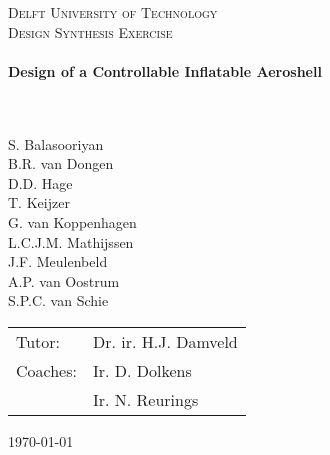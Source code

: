 \begin{titlepage}
\begin{center}
\AddToShipoutPicture*{\BackgroundPic}
\color{white}
\textsc{\LARGE Delft University of Technology}\\[0.3cm]
\textsc{\Large Design Synthesis Exercise}\\[0.5cm]

\vspace{5cm}
\HRule \\[0.4cm]
{\Large \bfseries Design of a Controllable Inflatable Aeroshell}\\[0.2cm]
{\Huge \bfseriest}\\[0.2cm]
\HRule \\[0.5cm]


\begin{flushleft}
\vspace{7cm}

S. Balasooriyan \\ B.R. van Dongen \\ D.D. Hage \\ T. Keijzer \\  G. van Koppenhagen \\ L.C.J.M. Mathijssen \\ J.F. Meulenbeld   \\ A.P. van Oostrum \\ S.P.C. van Schie\\
	\enlargethispage{15mm} \vspace{15mm}
	\hspace{-3.5mm}
	\begin{tabular}{l l}
		Tutor: & Dr. ir. H.J. Damveld \\
		Coaches: & Ir. D. Dolkens \\ 
		& Ir. N. Reurings \\
	\end{tabular}
\vfill
\begin{large}\today \end{large}
\end{flushleft}
\end{center}
\end{titlepage}